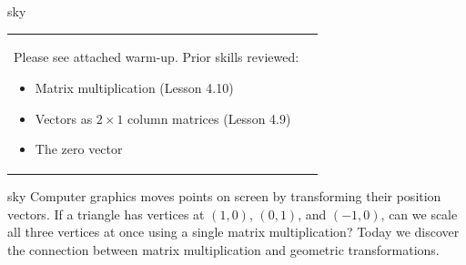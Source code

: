 \documentclass[10pt]{article}
\begin{document}
\begin{skillbox}{sky}
    \begin{tabularx}{\linewidth}{@{}X c@{}}
        \begin{minipage}[t]{0.55\linewidth}\vspace{0pt}
            Please see attached warm-up. Prior skills reviewed:
            \begin{itemize}[leftmargin=1.2em, itemsep=2pt]
                \item Matrix multiplication (Lesson 4.10)
                \item Vectors as $2\times 1$ column matrices (Lesson 4.9)
                \item The zero vector
            \end{itemize}
        \end{minipage}
        &
        \begin{minipage}[t]{0.38\linewidth}\vspace{0pt}\centering
        \end{minipage}
    \end{tabularx}
\end{skillbox}

\begin{skillbox}[Hook]{sky}
    Computer graphics moves points on screen by transforming their position vectors.
    If a triangle has vertices at $(1,0)$, $(0,1)$, and $(-1,0)$, can we scale all
    three vertices at once using a single matrix multiplication?  Today we discover the
    connection between matrix multiplication and geometric transformations.
\end{skillbox}
\end{document}
